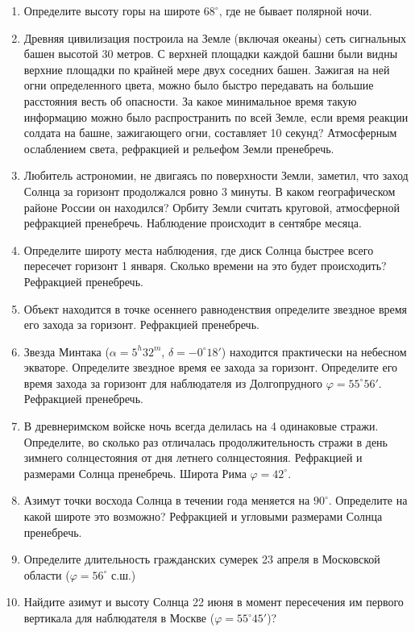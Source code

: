 \begin{enumerate}
    \item Определите высоту горы на широте $68^\circ$, где не бывает полярной ночи.
    \item Древняя цивилизация построила на Земле (включая океаны) сеть сигнальных башен высотой 30 метров. С верхней площадки каждой башни были видны верхние площадки по крайней мере двух соседних башен. Зажигая на ней огни определенного цвета, можно было быстро передавать на большие расстояния весть об опасности. За какое минимальное время такую информацию можно было распространить по всей Земле, если время реакции солдата на башне, зажигающего огни, составляет 10 секунд? Атмосферным ослаблением света, рефракцией и рельефом Земли пренебречь.
    \item Любитель астрономии, не двигаясь по поверхности Земли, заметил, что заход Солнца за горизонт продолжался ровно 3 минуты. В каком географическом районе России он находился? Орбиту Земли считать круговой, атмосферной рефракцией пренебречь. Наблюдение происходит в сентябре месяца.
    \item Определите широту места наблюдения, где диск Солнца быстрее всего пересечет горизонт 1 января. Сколько времени на это будет происходить? Рефракцией пренебречь.
    \item Объект находится в точке осеннего равноденствия определите звездное время его захода за горизонт. Рефракцией пренебречь.
    \item Звезда Минтака ($\alpha = 5^h32^m$, $\delta=-0^\circ18'$) находится практически на небесном экваторе. Определите звездное время ее захода за горизонт. Определите его время захода за горизонт для наблюдателя из Долгопрудного $\varphi = 55^\circ56'$. Рефракцией пренебречь.
    \item В древнеримском войске ночь всегда делилась на 4 одинаковые стражи. Определите, во сколько раз отличалась продолжительность стражи в день зимнего солнцестояния от дня летнего солнцестояния. Рефракцией и размерами Солнца пренебречь. Широта Рима $\varphi= 42^\circ$.
    \item Азимут точки восхода Солнца в течении года меняется на $90^\circ$. Определите на какой широте это возможно? Рефракцией и угловыми размерами Солнца пренебречь.
    \item Определите длительность гражданских сумерек 23 апреля в Московской области ($\varphi=56^\circ$ с.ш.)
    \item Найдите азимут и высоту Солнца 22 июня в момент пересечения им первого вертикала для наблюдателя в Москве ($\varphi = 55^\circ45'$)?

\end{enumerate}
